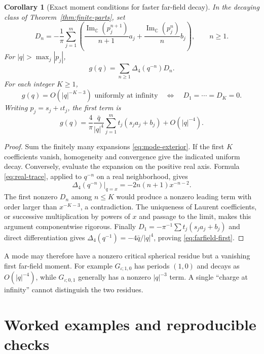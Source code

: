 \documentclass[11pt,a4paper]{article}
\numberwithin{equation}{section}
\newtheorem{corollary}[theorem]{Corollary}
\theoremstyle{definition}
\theoremstyle{remark}
\newcommand{\C}{\mathbb C}
\newcommand{\Fu}{\Delta_4}
\newcommand{\ImC}{\operatorname{Im}_{\C}}
\begin{document}
\begin{corollary}[Exact moment conditions for faster far-field decay]
\label{cor:moments}
In the decaying class of Theorem~\ref{thm:finite-parts}, set
\begin{equation}
 D_n=-\frac1\pi\sum_{j=1}^m\left(
  \frac{\ImC(p_j^{n+1})}{n+1}a_j
  +\frac{\ImC(p_j^n)}{n}b_j\right),\qquad n\ge1.
 \label{eq:global-moments}
\end{equation}
For $|q|>\max_j|p_j|$,
\begin{equation}
 g(q)=\sum_{n\ge1}\Fu(q^{-n})D_n.\label{eq:global-exterior}
\end{equation}
For each integer $K\ge1$,
\begin{equation}
 g(q)=O(|q|^{-K-3})\text{ uniformly at infinity}
 \quad\Longleftrightarrow\quad D_1=\cdots=D_K=0.
 \label{eq:moment-equivalence}
\end{equation}
Writing $p_j=s_j+\iota t_j$, the first term is
\begin{equation}
 g(q)=\frac4\pi\frac{\bar q}{|q|^4}
                    \sum_{j=1}^m t_j(s_j a_j+b_j)
                  +O(|q|^{-4}).\label{eq:farfield-first}
\end{equation}
\end{corollary}
\begin{proof}
Sum the finitely many expansions \eqref{eq:mode-exterior}.
If the first $K$ coefficients vanish, homogeneity and convergence give
the indicated uniform decay. Conversely, evaluate the expansion on the
positive real axis. Formula \eqref{eq:real-trace}, applied to $q^{-n}$
on a real neighborhood, gives
\[
 \Fu(q^{-n})\big|_{q=x}=-2n(n+1)x^{-n-2}.
\]
The first nonzero $D_n$ among $n\le K$ would produce a nonzero leading
term with order larger than $x^{-K-3}$, a contradiction. The uniqueness
of Laurent coefficients, or successive multiplication by powers of $x$
and passage to the limit, makes this argument componentwise rigorous.
Finally $D_1=-\pi^{-1}\sum t_j(s_j a_j+b_j)$ and direct differentiation
gives $\Fu(q^{-1})=-4\bar q/|q|^4$, proving
\eqref{eq:farfield-first}.
\end{proof}
A mode may therefore have a nonzero critical spherical residue but a
vanishing first far-field moment. For example $G_{\iota;1,0}$ has
periods $(1,0)$ and decays as $O(|q|^{-4})$, while
$G_{\iota;0,1}$ generally has a nonzero $|q|^{-3}$ term.
A single ``charge at infinity'' cannot distinguish the two residues.

\section{Worked examples and reproducible checks}
\label{sec:examples}
\end{document}

